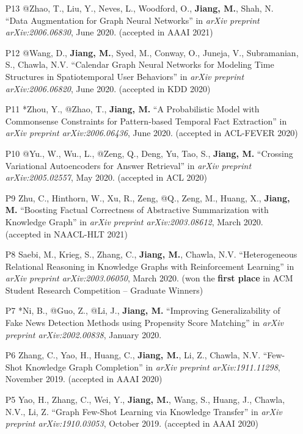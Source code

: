 \documentclass[10pt]{article}
\newenvironment{myindentpar}[1]%
{\begin{list}{}%
         {\setlength{\leftmargin}{#1}}%
         \item[]%
}
{\end{list}}
\newcounter{list}
\begin{document}
\begin{myindentpar}{0.00cm}
\begin{enumerate}[leftmargin=.5cm]
\item[P13] @Zhao, T., Liu, Y., Neves, L., Woodford, O., \textbf{Jiang, M.}, Shah, N. ``Data Augmentation for Graph Neural Networks'' in \textit{arXiv preprint arXiv:2006.06830}, June 2020. (accepted in AAAI 2021)

\item[P12] @Wang, D., \textbf{Jiang, M.}, Syed, M., Conway, O., Juneja, V., Subramanian, S., Chawla, N.V. ``Calendar Graph Neural Networks for Modeling Time Structures in Spatiotemporal User Behaviors'' in \textit{arXiv preprint arXiv:2006.06820}, June 2020. (accepted in KDD 2020)
		
\item[P11] *Zhou, Y., @Zhao, T., \textbf{Jiang, M.} ``A Probabilistic Model with Commonsense Constraints for Pattern-based Temporal Fact Extraction'' in \textit{arXiv preprint arXiv:2006.06436}, June 2020. (accepted in ACL-FEVER 2020)

\item[P10] @Yu., W., Wu., L., @Zeng, Q., Deng, Yu, Tao, S., \textbf{Jiang, M.} ``Crossing Variational Autoencoders for Answer Retrieval'' in \textit{arXiv preprint arXiv:2005.02557}, May 2020. (accepted in ACL 2020)
		
\item[P9] Zhu, C., Hinthorn, W., Xu, R., Zeng, @Q., Zeng, M., Huang, X., \textbf{Jiang, M.} ``Boosting Factual Correctness of Abstractive Summarization with Knowledge Graph'' in \textit{arXiv preprint arXiv:2003.08612}, March 2020. (accepted in NAACL-HLT 2021)

\item[P8] Saebi, M., Krieg, S., Zhang, C., \textbf{Jiang, M.}, Chawla, N.V. ``Heterogeneous Relational Reasoning in Knowledge Graphs with Reinforcement Learning'' in \textit{arXiv preprint arXiv:2003.06050}, March 2020. (won the \textbf{first place} in ACM Student Research Competition -- Graduate Winners)

\item[P7] *Ni, B., @Guo, Z., @Li, J., \textbf{Jiang, M.} ``Improving Generalizability of Fake News Detection Methods using Propensity Score Matching'' in \textit{arXiv preprint arXiv:2002.00838}, January 2020.
		
\item[P6] Zhang, C., Yao, H., Huang, C., \textbf{Jiang, M.}, Li, Z., Chawla, N.V. ``Few-Shot Knowledge Graph Completion'' in \textit{arXiv preprint arXiv:1911.11298}, November 2019. (accepted in AAAI 2020)

\item[P5] Yao, H., Zhang, C., Wei, Y., \textbf{Jiang, M.}, Wang, S., Huang, J., Chawla, N.V., Li, Z. ``Graph Few-Shot Learning via Knowledge Transfer'' in \textit{arXiv preprint arXiv:1910.03053}, October 2019. (accepted in AAAI 2020)
		

\end{enumerate}
\end{myindentpar}
\end{document}
